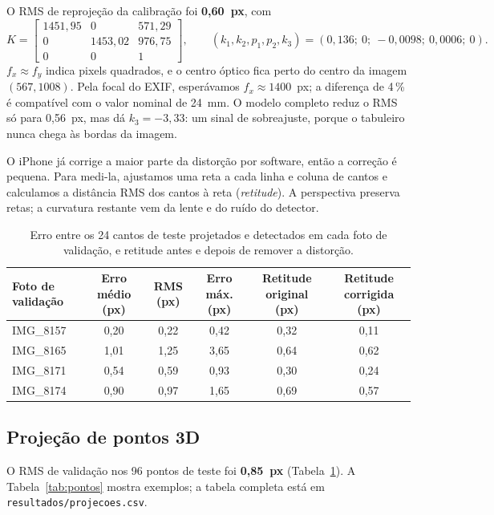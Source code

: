 \documentclass[10pt,a4paper]{article}
\begin{document}
O RMS de reprojeção da calibração foi \textbf{0,60~px}, com
\[
K = \begin{bmatrix} 1451{,}95 & 0 & 571{,}29\\ 0 & 1453{,}02 & 976{,}75\\
0 & 0 & 1 \end{bmatrix},\qquad
(k_1, k_2, p_1, p_2, k_3) = (0{,}136;\ 0;\ -0{,}0098;\ 0{,}0006;\ 0).
\]
$f_x \approx f_y$ indica pixels quadrados, e o centro óptico fica perto do
centro da imagem $(567, 1008)$. Pela focal do EXIF, esperávamos
$f_x \approx 1400$~px; a diferença de 4\,\% é compatível com o valor nominal de
24~mm. O modelo completo reduz o RMS só para 0,56~px, mas dá $k_3 = -3{,}33$:
um sinal de sobreajuste, porque o tabuleiro nunca chega às bordas da imagem.

O iPhone já corrige a maior parte da distorção por software, então a correção é
pequena. Para medi-la, ajustamos uma reta a cada linha e coluna de cantos e
calculamos a distância RMS dos cantos à reta (\emph{retitude}). A perspectiva
preserva retas; a curvatura restante vem da lente e do ruído do detector.

\begin{table}[htb]
  \centering\small
  \begin{tabular}{lccccc}
    \toprule
    Foto de validação & Erro médio (px) & RMS (px) & Erro máx. (px) &
    Retitude original (px) & Retitude corrigida (px)\\
    \midrule
    IMG\_8157 & 0,20 & 0,22 & 0,42 & 0,32 & 0,11\\
    IMG\_8165 & 1,01 & 1,25 & 3,65 & 0,64 & 0,62\\
    IMG\_8171 & 0,54 & 0,59 & 0,93 & 0,30 & 0,24\\
    IMG\_8174 & 0,90 & 0,97 & 1,65 & 0,69 & 0,57\\
    \bottomrule
  \end{tabular}
  \caption{Erro entre os 24 cantos de teste projetados e detectados em cada
  foto de validação, e retitude antes e depois de remover a distorção.}
  \label{tab:validacao}
\end{table}

\vspace{-6pt}
\subsection*{Projeção de pontos 3D}

O RMS de validação nos 96 pontos de teste foi \textbf{0,85~px}
(Tabela~\ref{tab:validacao}). A Tabela~\ref{tab:pontos} mostra exemplos; a
tabela completa está em \texttt{resultados/projecoes.csv}.
\end{document}
